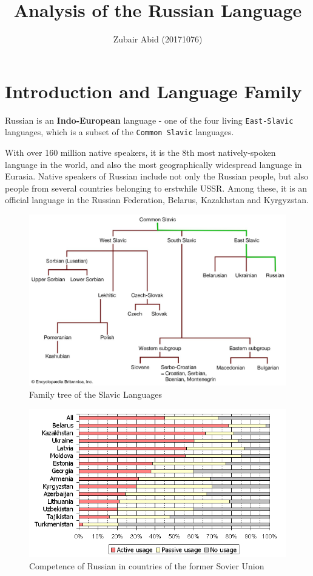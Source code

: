 \documentclass[
  a4paperpaper,
]{report}
\title{Analysis of the Russian Language}
\author{Zubair Abid (20171076)}
\date{}
\begin{document}
\maketitle

{
\setcounter{tocdepth}{2}
\tableofcontents
}
\hypertarget{introduction-and-language-family}{%
\chapter{Introduction and Language
Family}\label{introduction-and-language-family}}

Russian is an \textbf{Indo-European} language - one of the four living
\texttt{East-Slavic} languages, which is a subset of the
\texttt{Common\ Slavic} languages.

With over 160 million native speakers, it is the 8th most
natively-spoken language in the world, and also the most geographically
widespread language in Eurasia. Native speakers of Russian include not
only the Russian people, but also people from several countries
belonging to erstwhile USSR. Among these, it is an official language in
the Russian Federation, Belarus, Kazakhstan and Kyrgyzstan.

\begin{figure}
\centering
\includegraphics{./russtree_russ.jpg}
\caption{Family tree of the Slavic Languages}
\end{figure}

\begin{figure}
\centering
\includegraphics{russian_usage.PNG}
\caption{Competence of Russian in countries of the former Sovier Union}
\end{figure}
\end{document}
